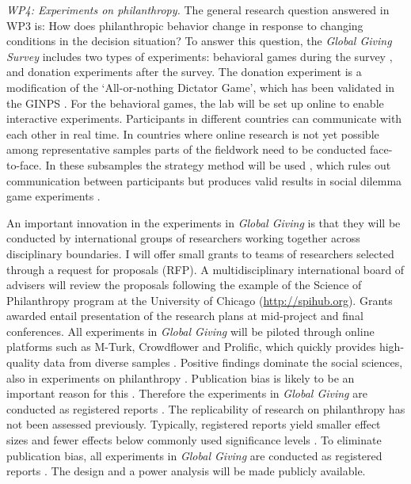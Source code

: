 \documentclass[twocolumn, serif, rga, numeric]{jote-article}
\begin{document}
\emph{WP4: Experiments on philanthropy.} The general research question answered in WP3 is: How does philanthropic behavior change in response to changing conditions in the decision situation? To answer this question, the \emph{Global Giving Survey} includes two types of experiments: behavioral games during the survey \cite{VanLange2007}, and donation experiments after the survey. The donation experiment is a modification of the `All-or-nothing Dictator Game', which has been validated in the GINPS \cite{VanLange2007, Bekkers2007a, Bekkers2015a}. For the behavioral games, the lab will be set up online to enable interactive experiments.
Participants in different countries can communicate with each other in real time. In countries where online research is not yet possible among representative samples parts of the fieldwork need to be conducted face-to-face. In these subsamples the strategy method will be used \cite{Selten1967}, which rules out communication between participants but produces valid results in social dilemma game experiments \cite{Fischbacher2012}.

An important innovation in the experiments in \emph{Global Giving} is that they will be conducted by international groups of researchers working together across disciplinary boundaries. I will offer small grants to teams of researchers selected through a request for proposals (RFP). A multidisciplinary international board of advisers will review the proposals following the example of the Science of Philanthropy program at the University of Chicago (\url{http://spihub.org}). Grants awarded entail presentation of the research plans at mid-project and final conferences. All experiments in \emph{Global Giving} will be piloted through online platforms such as M-Turk, Crowdflower and Prolific, which quickly provides high-quality data from diverse samples \cite{Hauser2015, Buhrmester2011, Casler2013}. Positive findings dominate the social sciences,\cite{Fanelli2012} also in experiments on philanthropy \cite{Bekkers2007}. Publication bias is likely to be an important reason for this \cite{Simonsohn2014}. Therefore the experiments in \emph{Global Giving} are conducted as registered reports \cite{Nosek2014}. The replicability of research on philanthropy has not been assessed previously. Typically, registered reports yield smaller effect sizes and fewer effects below commonly used significance levels \cite{Chang2015, Camerer2018, OpenScienceCollaboration2015}. To eliminate publication bias, all experiments in \emph{Global Giving} are conducted as registered reports \cite{Nosek2014}. The design and a power analysis will be made publicly available.
\end{document}
